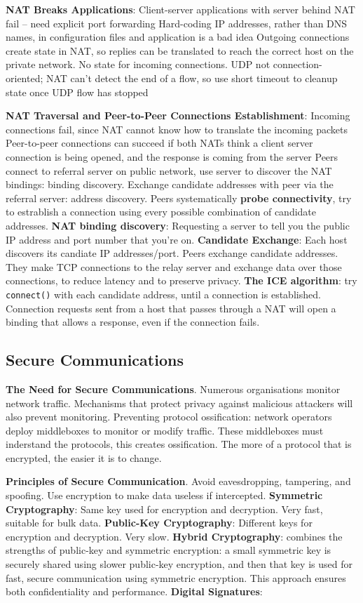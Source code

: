 \documentclass{article}
\begin{document}
\noindent \textbf{NAT Breaks Applications}:
Client-server applications with server behind NAT fail – need explicit port forwarding
Hard-coding IP addresses, rather than DNS names, in configuration files and application is a bad idea
Outgoing connections create state in NAT, so replies can be translated to reach the correct host on the private network.
No state for incoming connections.
UDP not connection-oriented; NAT can’t detect the end of a flow, so use short timeout to cleanup state once UDP flow has stopped

\noindent \textbf{NAT Traversal and Peer-to-Peer Connections Establishment}:
Incoming connections fail, since NAT cannot know how to translate the incoming packets
Peer-to-peer connections can succeed if both NATs think a client server connection is being opened, and the response is coming from the server
Peers connect to referral server on public network, use server to discover the NAT bindings: binding discovery.
Exchange candidate addresses with peer via the referral server: address discovery.
Peers systematically \textbf{probe connectivity}, try to estrablish a connection using every possible combination of candidate addresses.
\textbf{NAT binding discovery}: Requesting a server to tell you the public IP address and port number that you're on.
\textbf{Candidate Exchange}: Each host discovers its candiate IP addresses/port. Peers exchange candidate addresses.
They make TCP connections to the relay server and exchange data over those connections, to reduce latency and to preserve privacy.
\textbf{The ICE algorithm}: try \texttt{connect()} with each candidate address, until a connection is established.
Connection requests sent from a host that passes through a NAT will open a binding that allows a response, even if the connection fails.


\subsection*{Secure Communications}

\textbf{The Need for Secure Communications}. Numerous organisations monitor network traffic.
Mechanisms that protect privacy against malicious attackers will also prevent monitoring.
Preventing protocol ossification: network operators deploy middleboxes to monitor or modify traffic.
These middleboxes must inderstand the protocols, this creates ossification.
The more of a protocol that is encrypted, the easier it is to change.

\noindent \textbf{Principles of Secure Communication}. Avoid eavesdropping, tampering, and spoofing.
Use encryption to make data useless if intercepted.
\textbf{Symmetric Cryptography}: Same key used for encryption and decryption. Very fast, suitable for bulk data.
\textbf{Public-Key Cryptography}: Different keys for encryption and decryption. Very slow.
\textbf{Hybrid Cryptography}: combines the strengths of public-key and symmetric encryption:
a small symmetric key is securely shared using slower public-key encryption,
and then that key is used for fast, secure communication using symmetric encryption.
This approach ensures both confidentiality and performance.
\textbf{Digital Signatures}:
\end{document}
